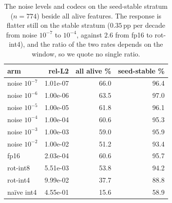 \begin{table}[htbp]
\caption{The noise levels and codecs on the seed-stable stratum ($n = 774$) beside all alive features. The response is flatter still on the stable stratum ($0.35$\,pp per decade from noise $10^{-7}$ to $10^{-4}$, against $2.6$ from fp16 to rot-int4), and the ratio of the two rates depends on the window, so we quote no single ratio.}
\label{tab:dosestrat}
\centering\small
\begin{tabular}{lrrr}
\toprule
arm & rel-L2 & all alive \% & seed-stable \% \\
\midrule
noise $10^{-7}$ & 1.01e-07 & 66.0 & 96.4 \\
noise $10^{-6}$ & 1.00e-06 & 63.5 & 97.0 \\
noise $10^{-5}$ & 1.00e-05 & 61.8 & 96.1 \\
noise $10^{-4}$ & 1.00e-04 & 60.6 & 95.3 \\
noise $10^{-3}$ & 1.00e-03 & 59.0 & 95.9 \\
noise $10^{-2}$ & 1.00e-02 & 51.2 & 93.4 \\
fp16 & 2.03e-04 & 60.6 & 95.7 \\
rot-int8 & 5.51e-03 & 53.8 & 94.2 \\
rot-int4 & 9.99e-02 & 37.7 & 88.8 \\
na\"ive int4 & 4.55e-01 & 15.6 & 58.9 \\
\bottomrule
\end{tabular}
\end{table}

